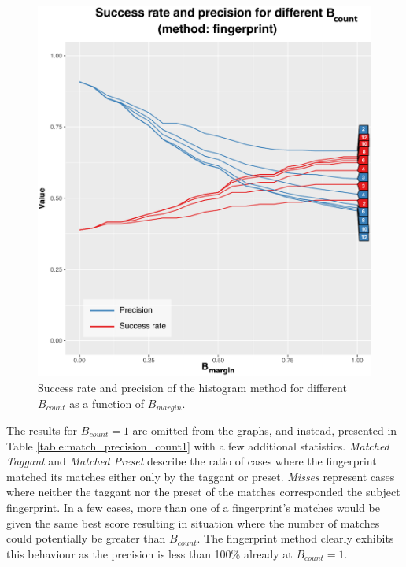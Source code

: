 \documentclass[thesis.tex]{subfiles}
\begin{document}
\begin{figure}
\centering \includegraphics[page=2,width=\textwidth,height=\textheight,keepaspectratio=true]{images/experiment/match_precision}
\caption{Success rate and precision of the histogram method for different $B_{count}$ as a function of $B_{margin}$.}
\label{figure:match_precision_histogram}
\end{figure}

\clearpage

The results for $B_{count}=1$ are omitted from the graphs, and instead, presented in Table \ref{table:match_precision_count1} with a few additional statistics. \emph{Matched Taggant} and \emph{Matched Preset} describe the ratio of cases where the fingerprint matched its matches either only by the taggant or preset. \emph{Misses} represent cases where neither the taggant nor the preset of the matches corresponded the subject fingerprint. In a few cases, more than one of a fingerprint's matches would be given the same best score resulting in situation where the number of matches could potentially be greater than $B_{count}$. The fingerprint method clearly exhibits this behaviour as the precision is less than 100\% already at $B_{count}=1$.
\end{document}
